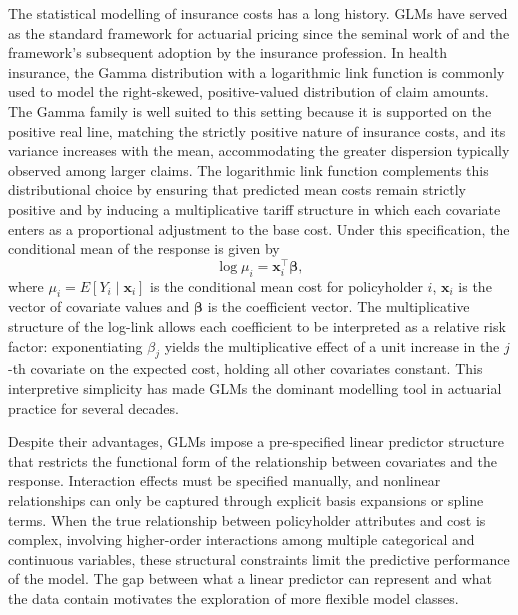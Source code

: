 The statistical modelling of insurance costs has a long history.
GLMs have served as the standard framework
for actuarial pricing since the seminal work of
\citet{nelder1972generalized} and the framework's subsequent adoption
by the insurance profession.  In health insurance, the Gamma distribution with
a logarithmic link function is commonly used \citep{mccullagh1989generalized, wuthrich2023statistical} to model the right-skewed,
positive-valued distribution of claim amounts.  The Gamma family is
well suited to this setting because it is supported on the positive
real line, matching the strictly positive nature of insurance costs,
and its variance increases with the mean, accommodating the greater
dispersion typically observed among larger claims.  The logarithmic
link function complements this distributional choice by ensuring that
predicted mean costs remain strictly positive and by inducing a
multiplicative tariff structure in which each covariate enters as a
proportional adjustment to the base cost.  Under this specification,
the conditional mean of the response is given by
\begin{equation}
\label{eq:glm_log_link_intro}
\log \mu_i = \mathbf{x}_i^\top \boldsymbol{\beta},
\end{equation}
where $\mu_i = E[Y_i \mid \mathbf{x}_i]$ is the conditional mean cost
for policyholder $i$, $\mathbf{x}_i$ is the vector of covariate values
and $\boldsymbol{\beta}$ is the coefficient vector.  The multiplicative
structure of the log-link allows each coefficient to be interpreted as a
relative risk factor: exponentiating $\beta_j$ yields the multiplicative
effect of a unit increase in the $j$-th covariate on the expected cost,
holding all other covariates constant.  This interpretive simplicity has
made GLMs the dominant modelling tool in actuarial practice for several
decades.

Despite their advantages, GLMs impose a pre-specified linear predictor
structure that restricts the functional form of the relationship between
covariates and the response.  Interaction effects must be specified
manually, and nonlinear relationships can only be captured through
explicit basis expansions or spline terms.  When the true relationship
between policyholder attributes and cost is complex, involving
higher-order interactions among multiple categorical and continuous
variables, these structural constraints limit the predictive performance
of the model.  The gap between what a linear predictor can represent and
what the data contain motivates the exploration of more flexible model
classes.

